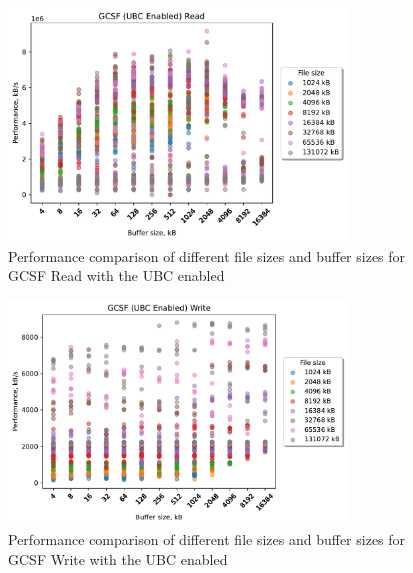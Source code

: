 \begin{figure}[!htb]
	\label{fig:bench_gcsf_no_ubc_scatter_read}
	\begin{center}
		\includegraphics[width=0.8\textwidth]{figures.nosync/benchmarking/GCSF/scatter-UBC Enabled-Read.pdf}
	\end{center}
	\caption[Comparison of Read performance for file size and buffer size for GCSF with the UBC disabled]{Performance comparison of different file sizes and buffer sizes for GCSF Read with the UBC enabled}
\end{figure}
\begin{figure}[!htb]
	\label{fig:bench_gcsf_no_ubc_scatter_write}
	\begin{center}
		\includegraphics[width=0.8\textwidth]{figures.nosync/benchmarking/GCSF/scatter-UBC Enabled-Write.pdf}
	\end{center}
	\caption[Comparison of Write performance for file size and buffer size for GCSF with the UBC disabled]{Performance comparison of different file sizes and buffer sizes for GCSF Write with the UBC enabled}
\end{figure}
\clearpage
